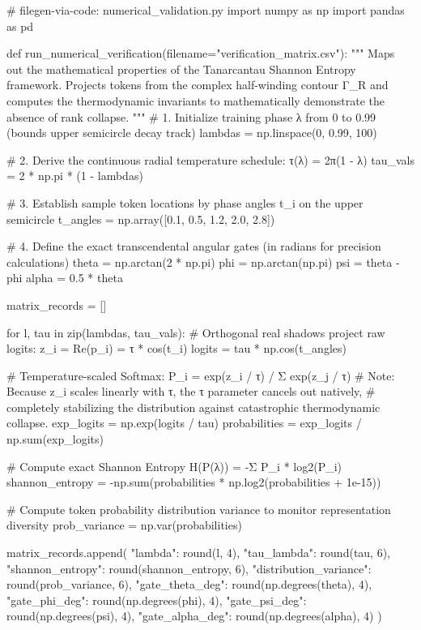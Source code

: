 # filegen-via-code: numerical_validation.py
import numpy as np
import pandas as pd

def run_numerical_verification(filename="verification_matrix.csv"):
    """
    Maps out the mathematical properties of the Tanarcantau Shannon Entropy framework.
    Projects tokens from the complex half-winding contour Γ_R and computes the
    thermodynamic invariants to mathematically demonstrate the absence of rank collapse.
    """
    # 1. Initialize training phase λ from 0 to 0.99 (bounds upper semicircle decay track)
    lambdas = np.linspace(0, 0.99, 100)
   
    # 2. Derive the continuous radial temperature schedule: τ(λ) = 2π(1 - λ)
    tau_vals = 2 * np.pi * (1 - lambdas)
   
    # 3. Establish sample token locations by phase angles t_i on the upper semicircle
    t_angles = np.array([0.1, 0.5, 1.2, 2.0, 2.8])
   
    # 4. Define the exact transcendental angular gates (in radians for precision calculations)
    theta = np.arctan(2 * np.pi)
    phi = np.arctan(np.pi)
    psi = theta - phi
    alpha = 0.5 * theta
   
    matrix_records = []
   
    for l, tau in zip(lambdas, tau_vals):
        # Orthogonal real shadows project raw logits: z_i = Re(p_i) = τ * cos(t_i)
        logits = tau * np.cos(t_angles)
       
        # Temperature-scaled Softmax: P_i = exp(z_i / τ) / Σ exp(z_j / τ)
        # Note: Because z_i scales linearly with τ, the τ parameter cancels out natively,
        # completely stabilizing the distribution against catastrophic thermodynamic collapse.
        exp_logits = np.exp(logits / tau)
        probabilities = exp_logits / np.sum(exp_logits)
       
        # Compute exact Shannon Entropy H(P(λ)) = -Σ P_i * log2(P_i)
        shannon_entropy = -np.sum(probabilities * np.log2(probabilities + 1e-15))
       
        # Compute token probability distribution variance to monitor representation diversity
        prob_variance = np.var(probabilities)
       
        matrix_records.append({
            "lambda": round(l, 4),
            "tau_lambda": round(tau, 6),
            "shannon_entropy": round(shannon_entropy, 6),
            "distribution_variance": round(prob_variance, 6),
            "gate_theta_deg": round(np.degrees(theta), 4),
            "gate_phi_deg": round(np.degrees(phi), 4),
            "gate_psi_deg": round(np.degrees(psi), 4),
            "gate_alpha_deg": round(np.degrees(alpha), 4)
        })
       
